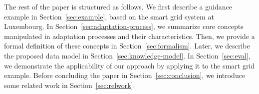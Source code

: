The rest of the paper is structured as follows. 
We first describe a guidance example in Section~\ref{sec:example}, based on the smart grid system at Luxembourg.
In Section~\ref{sec:adaptation-process}, we summarize core concepts manipulated in adaptation processes and their characteristics.
Then, we provide a formal definition of these concepts in Section~\ref{sec:formalism}.
Later, we describe the proposed data model in Section~\ref{sec:knowledge-model}.
In Section~\ref{sec:eval}, we demonstrate the applicability of our approach by applying it to the smart grid example.
Before concluding the paper in Section~\ref{sec:conclusion}, we introduce some related work in Section~\ref{sec:relwork}.